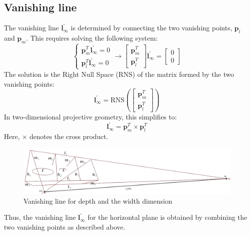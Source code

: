 \subsection{Vanishing line}
The vanishing line $\mathbf{l}^\prime_{\infty}$ is determined by connecting the two vanishing points, $\mathbf{p}_l$ and $\mathbf{p}_m$. 
This requires solving the following system:
\[\begin{cases} \mathbf{p}_m^T\mathbf{l}^\prime_{\infty}=0 \\ \mathbf{p}_l^T\mathbf{l}^\prime_{\infty}=0 \end{cases} \rightarrow \begin{bmatrix} \mathbf{p}_m^T \\ \mathbf{p}_l^T \end{bmatrix}\mathbf{l}^\prime_{\infty}=\begin{bmatrix} 0 \\ 0 \end{bmatrix}\]
The solution is the Right Null Space (RNS) of the matrix formed by the two vanishing points:
\[\mathbf{l}^\prime_{\infty}=\text{RNS}\left(\begin{bmatrix} \mathbf{p}_m^T \\ \mathbf{p}_l^T \end{bmatrix}\right)\]
In two-dimensional projective geometry, this simplifies to:
\[\mathbf{l}^\prime_{\infty}= \mathbf{p}_m^T \times \mathbf{p}_l^T\]
Here, $\times$ denotes the cross product. 
\begin{figure}[H]
    \centering
    \includegraphics[width=0.75\linewidth]{images/vanishing line.png}
    \caption{Vanishing line for depth and the width dimension}
\end{figure}
Thus, the vanishing line $\mathbf{l}^\prime_{\infty}$ for the horizontal plane is obtained by combining the two vanishing points as described above.